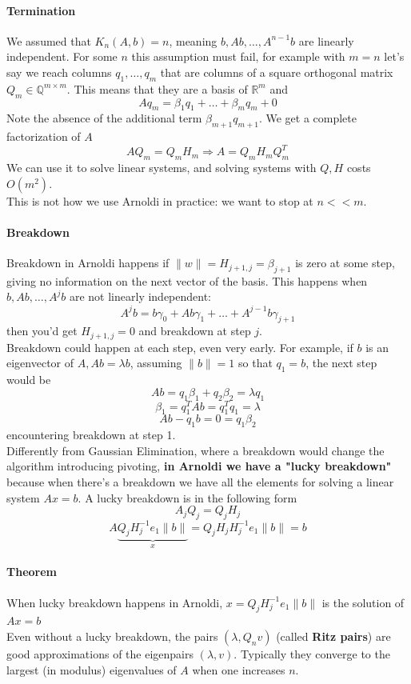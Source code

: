 \documentclass[10pt]{report}
\begin{document}
\paragraph{Termination} We assumed that $K_n(A,b) = n$, meaning $b, Ab, \ldots, A^{n-1}b$ are linearly independent. For some $n$ this assumption must fail, for example with $m=n$ let's say we reach columns $q_1,\ldots,q_m$ that are columns of a square orthogonal matrix $Q_m\in\mathbb{Q}^{m\times m}$. This means that they are a basis of $\mathbb{R}^m$ and $$Aq_m = \beta_1q_1 + \ldots + \beta_mq_m + 0$$ Note the absence of the additional term $\beta_{m+1}q_{m+1}$. We get a complete factorization of $A$ $$AQ_m=Q_mH_m\Rightarrow A=Q_mH_mQ_m^T$$ We can use it to solve linear systems, and solving systems with $Q,H$ costs $O(m^2)$.\\
This is not how we use Arnoldi in practice: we want to stop at $n << m$.
\paragraph{Breakdown} Breakdown in Arnoldi happens if $\|w\|= H_{j+1,j} = \beta_{j+1}$ is zero at some step, giving no information on the next vector of the basis. This happens when $b,Ab,\ldots,A^jb$ are not linearly independent:
$$A^jb = b\gamma_0+Ab\gamma_1+\ldots+A^{j-1}b\gamma_{j+1}$$
then you'd get $H_{j+1,j}=0$ and breakdown at step $j$.\\
Breakdown could happen at each step, even very early. For example, if $b$ is an eigenvector of $A, Ab= \lambda b$, assuming $\|b\|=1$ so that $q_1=b$, the next step would be
$$Ab = q_1\beta_1+q_2\beta_2 = \lambda q_1$$
$$\beta_1 = q_1^TAb = q_1^T q_1 = \lambda$$
$$Ab-q_1b = 0 = q_1\beta_2$$
encountering breakdown at step 1.\\
Differently from Gaussian Elimination, where a breakdown would change the algorithm introducing pivoting, \textbf{in Arnoldi we have a "lucky breakdown"} because when there's a breakdown we have all the elements for solving a linear system $Ax=b$. A lucky breakdown is in the following form $$A_jQ_j = Q_jH_j$$
$$A\underset{x}{\underbrace{Q_jH_j^{-1}e_1\|b\|}} = Q_jH_jH_j^{-1}e_1\|b\|=b$$
\paragraph{Theorem} When lucky breakdown happens in Arnoldi, $x=Q_jH_j^{-1}e_1\|b\|$ is the solution of $Ax = b$\\
Even without a lucky breakdown, the pairs $(\lambda, Q_nv)$ (called \textbf{Ritz pairs}) are good approximations of the eigenpairs $(\lambda, v)$. Typically they converge to the largest (in modulus) eigenvalues of $A$ when one increases $n$.
\end{document}
